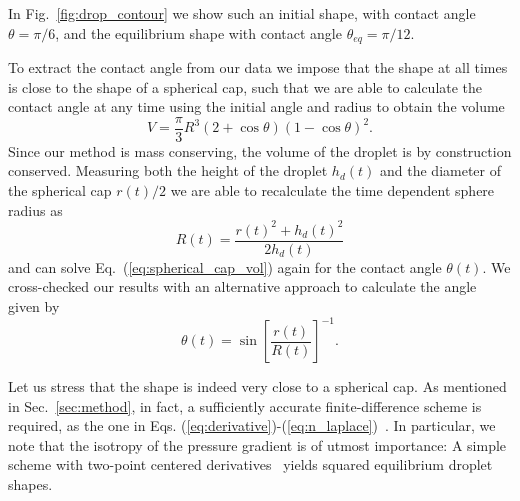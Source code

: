 In Fig.~\ref{fig:drop_contour} we show such an initial shape, with contact angle $\theta = \pi/6$, and the equilibrium shape with contact angle $\theta_{eq} = \pi/12$. 

To extract the contact angle from our data we impose that the shape at all times is close to the shape of a spherical cap, such that we are able to calculate the contact angle at any time using the initial angle and radius to obtain the volume
\begin{equation}
\label{eq:spherical_cap_vol}
    V = \frac{\pi}{3}R^3(2+\cos{\theta})(1-\cos{\theta})^2 .
\end{equation}
Since our method is mass conserving, the volume of the droplet is by construction conserved. 
Measuring both the height of the droplet $h_d(t)$ and the diameter of the spherical cap $r(t)/2$ we are able to recalculate the time dependent sphere radius as
\begin{equation}
    R(t) = \frac{r(t)^2+ h_d(t)^2}{2h_d(t)} 
\end{equation}
and can solve Eq.~(\ref{eq:spherical_cap_vol}) again for the contact angle $\theta(t)$. 
We cross-checked our results with an alternative approach to calculate the angle given by
\begin{equation}
    \theta(t) = \sin{\left[\frac{r(t)}{R(t)}\right]}^{-1}.
\end{equation}

Let us stress that the shape is indeed very close to a spherical cap. 
As mentioned in Sec.~\ref{sec:method}, in fact, a sufficiently accurate finite-difference scheme is required, as the one in Eqs. (\ref{eq:derivative})-(\ref{eq:n_laplace})~\cite{thampiIsotropicDiscreteLaplacian2013}. 
In particular, we note that the isotropy of the pressure gradient is of utmost importance: A simple scheme with two-point centered derivatives~\cite{zhouLatticeBoltzmannMethods2004} yields squared equilibrium droplet shapes.
 
